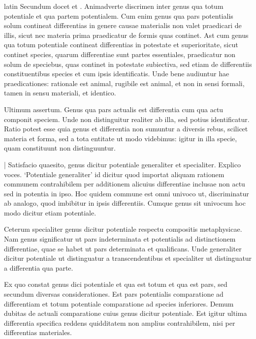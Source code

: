 \begin{otherlanguage*}{latin}
\pstart
 Secundum docet  et . Animadverte discrimen inter genus qua totum potentiale et qua partem potentialem. Cum enim genus qua pars potentialis solum contineat differentias in genere causae materialis non valet praedicari de illis, sicut nec materia prima praedicatur de formis quas continet. Ast cum genus qua totum potentiale contineat differentias in potestate et superioritate, sicut continet species, quarum differentiae sunt partes essentiales, praedicatur non solum de speciebus, quas continet in potestate subiectiva, sed etiam de differentiis constituentibus species et cum ipsis identificatis. Unde bene audiuntur hae praedicationes: rationale est animal, rugibile est animal, et non in sensi formali, tamen in sensu materiali, et identico. 
\pend

\pstart
 Ultimum assertum. Genus qua pars actualis est differentia cum qua actu componit speciem. Unde non distinguitur realiter ab illa, sed potius identificatur. Ratio potest esse quia genus et differentia non sumuntur a diversis rebus, scilicet materia et forma, sed a tota entitate ut modo videbimus: igitur in illa specie, quam constituunt non distinguuntur. 
\pend

\pstart
 \textnormal{|}   Satisfacio quaesito, genus dicitur potentiale generaliter et specialiter. Explico voces. `Potentiale generaliter' id dicitur quod importat aliquam rationem communem contrahibilem per additionem alicuius differentiae inclusae non actu sed in potentia in ipso. Hoc quidem commune est omni univoco ut, discriminatur ab analogo, quod imbibitur in ipsis differentiis. Cumque genus sit univocum hoc modo dicitur etiam potentiale. 
\pend

\pstart
 Ceterum specialiter genus dicitur potentiale respectu compositis metaphysicae. Nam genus significatur ut pars indeterminata et potentialis ad distinctionem differentiae, quae se habet ut pars determinata et qualificans. Unde generaliter dicitur potentiale ut distinguatur a transcendentibus et specialiter ut distinguatur a differentia qua parte. 
\pend

\pstart
 Ex quo constat genus dici potentiale et qua est totum et qua est pars, sed secundum diversas considerationes. Est pars potentialis comparatione ad differentiam et totum potentiale comparatione ad species inferiores. Demum dubitas de actuali comparatione cuius genus dicitur potentiale. Est igitur ultima differentia specifica reddens quidditatem non amplius contrahibilem, nisi per differentias materiales. 
\pend


\end{otherlanguage*}
